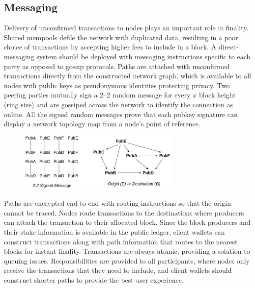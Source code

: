 \documentclass[a4paper,	10pt]{extarticle}
\begin{document}
\subsection{Messaging}
Delivery of unconfirmed transactions to nodes plays an important role in finality. Shared mempools defile the network with duplicated data, resulting in a poor choice of transactions by accepting higher fees to include in a block. A direct-messaging system should be deployed with messaging instructions specific to each party as opposed to gossip protocols. Paths are attached with unconfirmed transactions directly from the constructed network graph, which is available to all nodes with public keys as pseudonymous identities protecting privacy. Two peering parties mutually sign a 2–2 random message for every $x$ block height (ring size) and are gossiped across the network to identify the connection as online. All the signed random messages prove that each pubkey signature can display a network topology map from a node's point of reference. \\
\begin{figure}[H]
\begin{center}
\includegraphics[width=8cm]{topology}
\end{center}
\end{figure}
Paths are encrypted end-to-end with routing \cite{poon2016bitcoin} instructions so that the origin cannot be traced. Nodes route transactions to the destinations where producers can attach the transaction to their allocated block. Since the block producers and their stake information is available in the public ledger, client wallets can construct transactions along with path information that routes to the nearest blocks for instant finality. Transactions are always atomic, providing a solution to queuing issues. Responsibilities are provided to all participants, where nodes only receive the transactions that they need to include, and client wallets should construct shorter paths to provide the best user experience.
\end{document}

